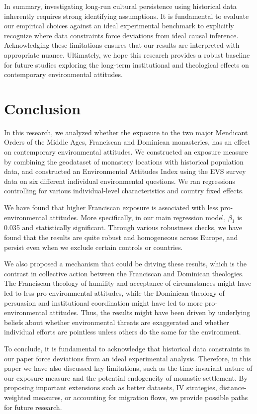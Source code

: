 \documentclass[12pt, a4paper]{article}
\begin{document}
In summary, investigating long-run cultural persistence using historical data inherently requires strong identifying assumptions. 
It is fundamental to evaluate our empirical choices against an ideal experimental benchmark to explicitly recognize where data constraints force deviations from ideal causal inference. 
Acknowledging these limitations ensures that our results are interpreted with appropriate nuance. 
Ultimately, we hope this research provides a robust baseline for future studies exploring the long-term institutional and theological 
effects on contemporary environmental attitudes.

\section{Conclusion}

In this research, we analyzed whether the exposure to the two major Mendicant Orders of the Middle Ages, 
Franciscan and Dominican monasteries, has an effect on contemporary environmental attitudes. We constructed an 
exposure measure by combining the geodataset of monastery locations with historical population data, and constructed 
an Environmental Attitudes Index using the EVS survey data on six different individual environmental questions. 
We ran regressions controlling for various individual-level characteristics and country fixed effects.

We have found that higher Franciscan exposure is associated with less pro-environmental attitudes. 
More specifically, in our main regression model, $\beta_1$ is 0.035 and statistically significant. 
Through various robustness checks, we have found that the results are quite robust 
and homogeneous across Europe, and persist even when we exclude certain controls or countries. 

We also proposed a mechanism that could be driving these results, which is the contrast in collective action between the 
Franciscan and Dominican theologies. The Franciscan theology of humility and acceptance of circumstances might have led to less
pro-environmental attitudes, while the Dominican theology of persuasion and institutional coordination might have 
led to more pro-environmental attitudes. Thus, the results might have been driven by underlying beliefs about whether 
environmental threats are exaggerated and whether individual efforts are pointless unless others do the same 
for the environment. 

To conclude, it is fundamental to acknowledge that historical data constraints in our paper force deviations from an ideal experimental 
analysis. Therefore, in this paper we have also discussed key limitations, such as the time-invariant nature of our exposure 
measure and the potential endogeneity of monastic settlement. By proposing important extensions such as better datasets, IV strategies, 
distance-weighted measures, or accounting for migration flows, we provide possible paths for future research.
\end{document}

